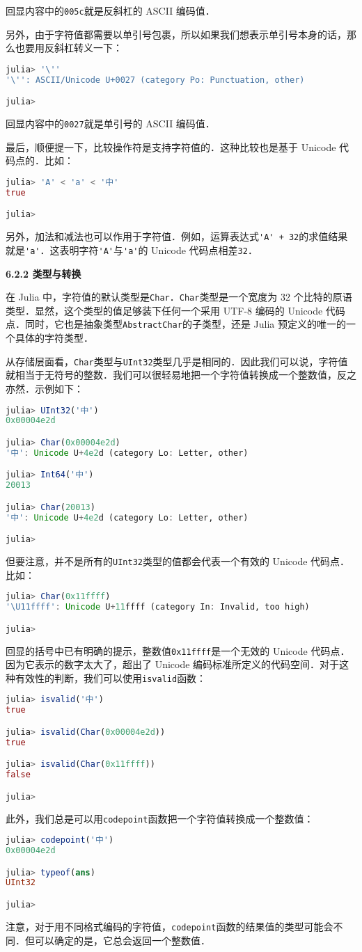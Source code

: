 回显内容中的\verb|005c|就是反斜杠的 ASCII 编码值．

另外，由于字符值都需要以单引号包裹，所以如果我们想表示单引号本身的话，那么也要用反斜杠转义一下：
\begin{lstlisting}[language=julia]
julia> '\''
'\'': ASCII/Unicode U+0027 (category Po: Punctuation, other)

julia> 
\end{lstlisting}

回显内容中的\verb|0027|就是单引号的 ASCII 编码值．

最后，顺便提一下，比较操作符是支持字符值的．这种比较也是基于 Unicode 代码点的．比如：
\begin{lstlisting}[language=julia]
julia> 'A' < 'a' < '中'
true

julia> 
\end{lstlisting}

另外，加法和减法也可以作用于字符值．例如，运算表达式\verb|'A' + 32|的求值结果就是\verb|'a'|．这表明字符\verb|'A'|与\verb|'a'|的 Unicode 代码点相差\verb|32|．

\textbf{6.2.2 类型与转换}

在 Julia 中，字符值的默认类型是\verb|Char|．\verb|Char|类型是一个宽度为 32 个比特的原语类型．显然，这个类型的值足够装下任何一个采用 UTF-8 编码的 Unicode 代码点．同时，它也是抽象类型\verb|AbstractChar|的子类型，还是 Julia 预定义的唯一的一个具体的字符类型．

从存储层面看，\verb|Char|类型与\verb|UInt32|类型几乎是相同的．因此我们可以说，字符值就相当于无符号的整数．我们可以很轻易地把一个字符值转换成一个整数值，反之亦然．示例如下：
\begin{lstlisting}[language=julia]
julia> UInt32('中')
0x00004e2d

julia> Char(0x00004e2d)
'中': Unicode U+4e2d (category Lo: Letter, other) 

julia> Int64('中')
20013

julia> Char(20013)
'中': Unicode U+4e2d (category Lo: Letter, other)

julia> 
\end{lstlisting}

但要注意，并不是所有的\verb|UInt32|类型的值都会代表一个有效的 Unicode 代码点．比如：
\begin{lstlisting}[language=julia]
julia> Char(0x11ffff)
'\U11ffff': Unicode U+11ffff (category In: Invalid, too high)

julia> 
\end{lstlisting}

回显的括号中已有明确的提示，整数值\verb|0x11ffff|是一个无效的 Unicode 代码点．因为它表示的数字太大了，超出了 Unicode 编码标准所定义的代码空间．对于这种有效性的判断，我们可以使用\verb|isvalid|函数：
\begin{lstlisting}[language=julia]
julia> isvalid('中')
true

julia> isvalid(Char(0x00004e2d))
true

julia> isvalid(Char(0x11ffff))
false

julia> 
\end{lstlisting}

此外，我们总是可以用\verb|codepoint|函数把一个字符值转换成一个整数值：
\begin{lstlisting}[language=julia]
julia> codepoint('中')
0x00004e2d

julia> typeof(ans)
UInt32

julia> 
\end{lstlisting}

注意，对于用不同格式编码的字符值，\verb|codepoint|函数的结果值的类型可能会不同．但可以确定的是，它总会返回一个整数值．
